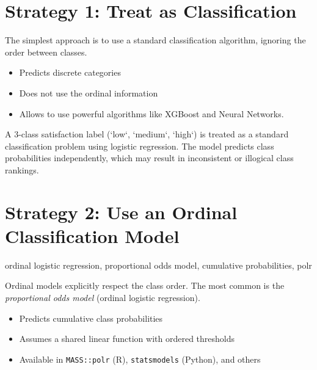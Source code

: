 \documentclass[12pt,openany]{book}
\begin{document}
\vspace{10pt}



\section{Strategy 1: Treat as Classification}

The simplest approach is to use a standard classification algorithm, ignoring
the order between classes.

\begin{itemize}
    \item Predicts discrete categories
    \item Does not use the ordinal information
    \item Allows to use powerful algorithms like XGBoost and Neural Networks.
\end{itemize}

\begin{examplebox}
A 3-class satisfaction label (`low`, `medium`, `high`) is treated as a
standard classification problem using logistic regression. The model
predicts class probabilities independently, which may result in
inconsistent or illogical class rankings.
\end{examplebox}

\vspace{5pt}



\section{Strategy 2: Use an Ordinal Classification Model}

\begin{keywordsbox}
ordinal logistic regression, proportional odds model, cumulative probabilities, polr
\end{keywordsbox}

Ordinal models explicitly respect the class order. The most common is
the \textit{proportional odds model} (ordinal logistic regression).

\begin{itemize}
    \item Predicts cumulative class probabilities
    \item Assumes a shared linear function with ordered thresholds
    \item Available in \texttt{MASS::polr} (R), 
          \texttt{statsmodels} (Python), and others
\end{itemize}
\end{document}

